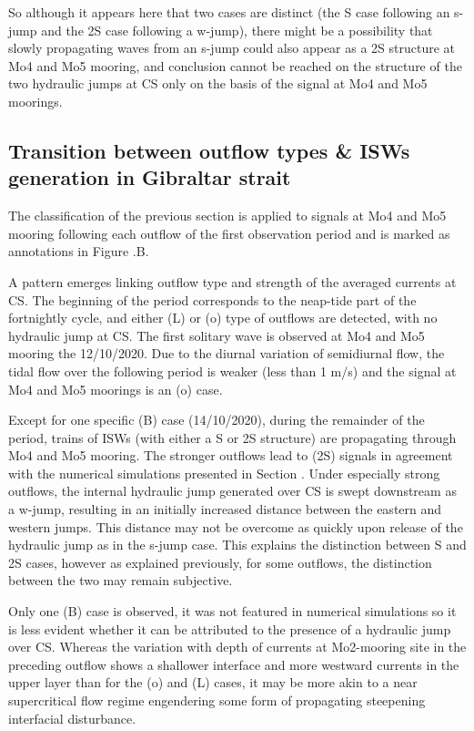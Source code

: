 So although it appears here that two cases are distinct (the S case following an s-jump and the 2S case following a w-jump), there might be a possibility that slowly propagating waves from an s-jump could also appear as a 2S structure at Mo4 and Mo5 mooring, and conclusion cannot be reached on the structure of the two hydraulic jumps at CS only on the basis of the signal at Mo4 and Mo5 moorings.


\subsection{Transition between outflow types \& ISWs generation in Gibraltar strait}

The classification of the previous section is applied to signals at Mo4 and Mo5 mooring following each outflow of the first observation period and is marked as annotations in Figure .B.

A pattern emerges linking outflow type and strength of the averaged currents at CS. The beginning of the period corresponds to the neap-tide part of the fortnightly cycle, and either (L) or (o) type of outflows are detected, with no hydraulic jump at CS. The first solitary wave is observed at Mo4 and Mo5 mooring the 12/10/2020. Due to the diurnal variation of semidiurnal flow, the tidal flow over the following period is weaker (less than 1 m/s) and the signal at Mo4 and Mo5 moorings is an (o) case.

Except for one specific (B) case (14/10/2020), during the remainder of the period, trains of ISWs (with either a S or 2S structure) are propagating through Mo4 and Mo5 mooring. The stronger outflows lead to (2S) signals in agreement with the numerical simulations presented in Section . Under especially strong outflows, the internal hydraulic jump generated over CS is swept downstream as a w-jump, resulting in an initially increased distance between the eastern and western jumps. This distance may not be overcome as quickly upon release of the hydraulic jump as in the s-jump case. This explains the distinction between S and 2S cases, however as explained previously, for some outflows, the distinction between the two may remain subjective.

Only one (B) case is observed, it was not featured in numerical simulations so it is less evident whether it can be attributed to the presence of a hydraulic jump over CS. Whereas the variation with depth of currents at Mo2-mooring site in the preceding outflow shows a shallower interface and more westward currents in the upper layer than for the (o) and (L) cases, it may be more akin to a near supercritical flow regime engendering some form of propagating steepening interfacial disturbance.

